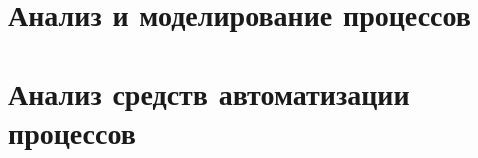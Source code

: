 \documentclass{article}
\begin{document}
\section{Анализ и моделирование процессов}


\section{Анализ средств автоматизации процессов}

\end{document}
